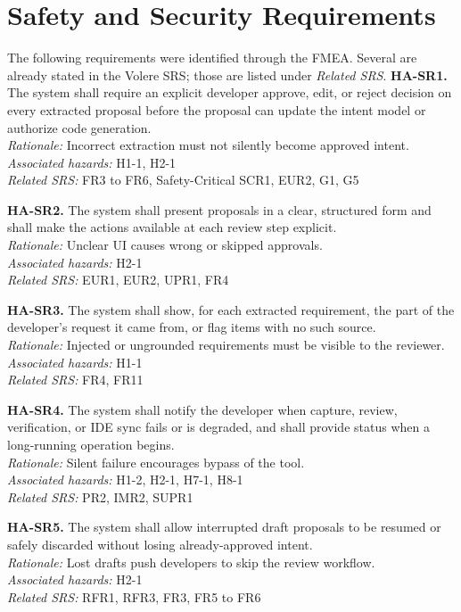 \documentclass{article}
\begin{document}
\section{Safety and Security Requirements}
\label{sec:SR}

The following requirements were identified through the FMEA. Several are already
stated in the Volere SRS; those are listed under \textit{Related SRS}. 
\newline
\noindent\textbf{HA-SR1.} The system shall require an explicit developer approve,
edit, or reject decision on every extracted proposal before the proposal can
update the intent model or authorize code generation.\\
\textit{Rationale:} Incorrect extraction must not silently become approved
intent.\\
\textit{Associated hazards:} H1-1, H2-1\\
\textit{Related SRS:} FR3 to FR6, Safety-Critical SCR1, EUR2, G1, G5

\medskip
\noindent\textbf{HA-SR2.} The system shall present proposals in a clear, structured
form and shall make the actions available at each review step explicit.\\
\textit{Rationale:} Unclear UI causes wrong or skipped approvals.\\
\textit{Associated hazards:} H2-1\\
\textit{Related SRS:} EUR1, EUR2, UPR1, FR4

\medskip
\noindent\textbf{HA-SR3.} The system shall show, for each extracted requirement,
the part of the developer's request it came from, or flag items with no such
source.\\
\textit{Rationale:} Injected or ungrounded requirements must be visible to the
reviewer.\\
\textit{Associated hazards:} H1-1\\
\textit{Related SRS:} FR4, FR11

\medskip
\noindent\textbf{HA-SR4.} The system shall notify the developer when capture,
review, verification, or IDE sync fails or is degraded, and shall provide
status when a long-running operation begins.\\
\textit{Rationale:} Silent failure encourages bypass of the tool.\\
\textit{Associated hazards:} H1-2, H2-1, H7-1, H8-1\\
\textit{Related SRS:} PR2, IMR2, SUPR1

\medskip
\noindent\textbf{HA-SR5.} The system shall allow interrupted draft proposals to be
resumed or safely discarded without losing already-approved intent.\\
\textit{Rationale:} Lost drafts push developers to skip the review workflow.\\
\textit{Associated hazards:} H2-1\\
\textit{Related SRS:} RFR1, RFR3, FR3, FR5 to FR6
\end{document}
